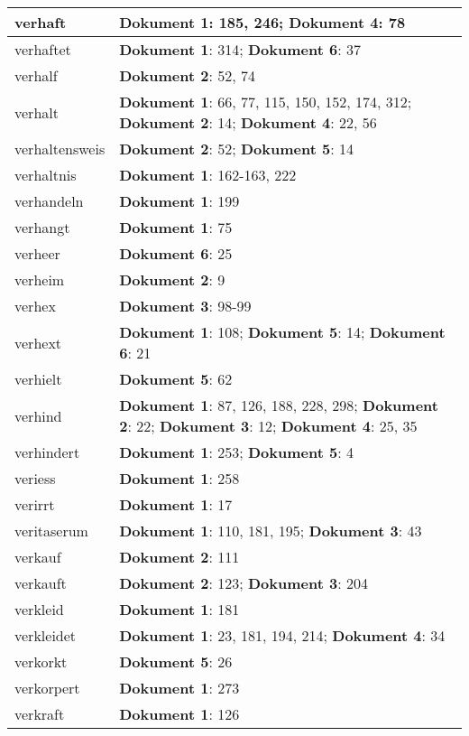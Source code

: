 \documentclass[a5paper]{article}
\begin{document}
\begin{longtable}[l]{|l|p{3in}|}
\hline
verhaft & \textbf{Dokument 1}: 185, 246; \textbf{Dokument 4}: 78 \\
\hline
verhaftet & \textbf{Dokument 1}: 314; \textbf{Dokument 6}: 37 \\
\hline
verhalf & \textbf{Dokument 2}: 52, 74 \\
\hline
verhalt & \textbf{Dokument 1}: 66, 77, 115, 150, 152, 174, 312; \textbf{Dokument 2}: 14; \textbf{Dokument 4}: 22, 56 \\
\hline
verhaltensweis & \textbf{Dokument 2}: 52; \textbf{Dokument 5}: 14 \\
\hline
verhaltnis & \textbf{Dokument 1}: 162-163, 222 \\
\hline
verhandeln & \textbf{Dokument 1}: 199 \\
\hline
verhangt & \textbf{Dokument 1}: 75 \\
\hline
verheer & \textbf{Dokument 6}: 25 \\
\hline
verheim & \textbf{Dokument 2}: 9 \\
\hline
verhex & \textbf{Dokument 3}: 98-99 \\
\hline
verhext & \textbf{Dokument 1}: 108; \textbf{Dokument 5}: 14; \textbf{Dokument 6}: 21 \\
\hline
verhielt & \textbf{Dokument 5}: 62 \\
\hline
verhind & \textbf{Dokument 1}: 87, 126, 188, 228, 298; \textbf{Dokument 2}: 22; \textbf{Dokument 3}: 12; \textbf{Dokument 4}: 25, 35 \\
\hline
verhindert & \textbf{Dokument 1}: 253; \textbf{Dokument 5}: 4 \\
\hline
veriess & \textbf{Dokument 1}: 258 \\
\hline
verirrt & \textbf{Dokument 1}: 17 \\
\hline
veritaserum & \textbf{Dokument 1}: 110, 181, 195; \textbf{Dokument 3}: 43 \\
\hline
verkauf & \textbf{Dokument 2}: 111 \\
\hline
verkauft & \textbf{Dokument 2}: 123; \textbf{Dokument 3}: 204 \\
\hline
verkleid & \textbf{Dokument 1}: 181 \\
\hline
verkleidet & \textbf{Dokument 1}: 23, 181, 194, 214; \textbf{Dokument 4}: 34 \\
\hline
verkorkt & \textbf{Dokument 5}: 26 \\
\hline
verkorpert & \textbf{Dokument 1}: 273 \\
\hline
verkraft & \textbf{Dokument 1}: 126 \\
\hline

\end{longtable}
\end{document}
